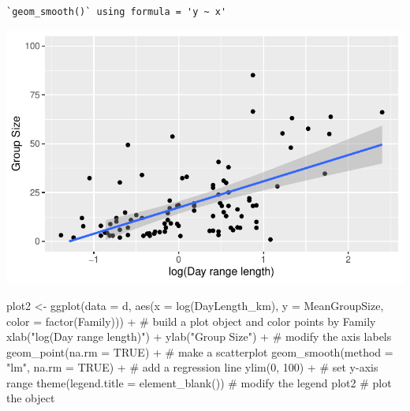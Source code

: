 \documentclass[
  letterpaper,
  DIV=11,
  numbers=noendperiod]{scrartcl}
\newenvironment{Shaded}{\begin{snugshade}}{\end{snugshade}}
\newcommand{\AttributeTok}[1]{\textcolor[rgb]{0.40,0.45,0.13}{#1}}
\newcommand{\CommentTok}[1]{\textcolor[rgb]{0.37,0.37,0.37}{#1}}
\newcommand{\ConstantTok}[1]{\textcolor[rgb]{0.56,0.35,0.01}{#1}}
\newcommand{\DecValTok}[1]{\textcolor[rgb]{0.68,0.00,0.00}{#1}}
\newcommand{\FunctionTok}[1]{\textcolor[rgb]{0.28,0.35,0.67}{#1}}
\newcommand{\NormalTok}[1]{\textcolor[rgb]{0.00,0.23,0.31}{#1}}
\newcommand{\OtherTok}[1]{\textcolor[rgb]{0.00,0.23,0.31}{#1}}
\newcommand{\SpecialCharTok}[1]{\textcolor[rgb]{0.37,0.37,0.37}{#1}}
\newcommand{\StringTok}[1]{\textcolor[rgb]{0.13,0.47,0.30}{#1}}
\begin{document}
\begin{verbatim}
`geom_smooth()` using formula = 'y ~ x'
\end{verbatim}

\includegraphics{EDA-challenge_files/figure-pdf/unnamed-chunk-4-1.pdf}

\begin{Shaded}
\begin{Highlighting}[]
\NormalTok{plot2 }\OtherTok{\textless{}{-}} \FunctionTok{ggplot}\NormalTok{(}\AttributeTok{data =}\NormalTok{ d, }
            \FunctionTok{aes}\NormalTok{(}\AttributeTok{x =} \FunctionTok{log}\NormalTok{(DayLength\_km), }
                \AttributeTok{y =}\NormalTok{ MeanGroupSize,}
                \AttributeTok{color =} \FunctionTok{factor}\NormalTok{(Family))) }\SpecialCharTok{+}  \CommentTok{\# build a plot object and color points by Family}
  \FunctionTok{xlab}\NormalTok{(}\StringTok{"log(Day range length)"}\NormalTok{) }\SpecialCharTok{+} \FunctionTok{ylab}\NormalTok{(}\StringTok{"Group Size"}\NormalTok{) }\SpecialCharTok{+} \CommentTok{\# modify the axis labels}
  \FunctionTok{geom\_point}\NormalTok{(}\AttributeTok{na.rm =} \ConstantTok{TRUE}\NormalTok{) }\SpecialCharTok{+} \CommentTok{\# make a scatterplot}
  \FunctionTok{geom\_smooth}\NormalTok{(}\AttributeTok{method =} \StringTok{"lm"}\NormalTok{, }\AttributeTok{na.rm =} \ConstantTok{TRUE}\NormalTok{) }\SpecialCharTok{+} \CommentTok{\# add a regression line}
  \FunctionTok{ylim}\NormalTok{(}\DecValTok{0}\NormalTok{, }\DecValTok{100}\NormalTok{) }\SpecialCharTok{+} \CommentTok{\# set y{-}axis range}
  \FunctionTok{theme}\NormalTok{(}\AttributeTok{legend.title =} \FunctionTok{element\_blank}\NormalTok{()) }\CommentTok{\# modify the legend}
\NormalTok{plot2 }\CommentTok{\# plot the object}
\end{Highlighting}
\end{Shaded}
\end{document}
